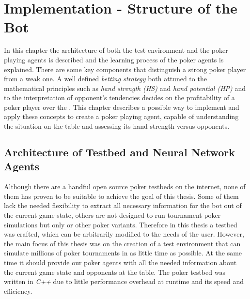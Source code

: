 
\chapter{Implementation - Structure of the Bot}
\label{cha:implementation}
In this chapter the architecture of both the test environment and the poker playing agents is described and the learning process of the poker agents is explained. There are some key components that distinguish a strong poker player from a weak one. A well defined \textit{betting strategy} both attuned to the mathematical principles such as \textit{hand strength (HS)} and \textit{hand potential (HP)} and to the interpretation of opponent's tendencies decides on the profitability of a poker player over the  \cite{opp_modeling}. This chapter describes a possible way to implement and apply these concepts to create a poker playing agent, capable of understanding the situation on the table and assessing its hand strength versus opponents. \pagebreak

\section{Architecture of Testbed and Neural Network Agents}
\label{sec:architecture}
Although there are a handful open source poker testbeds on the internet, none of them has proven to be suitable to achieve the goal of this thesis. Some of them lack the needed flexibility to extract all necessary information for the bot out of the current game state, others are not designed to run tournament poker simulations but only  or other poker variants. Therefore in this thesis a testbed was crafted, which can be arbitrarily modified to the needs of the user. However, the main focus of this thesis was on the creation of a test environment that can simulate millions of poker tournaments in as little time as possible. At the same time it should provide our poker agents with all the needed information about the current game state and opponents at the table. The poker testbed was written in \textit{C++} due to little performance overhead at runtime and its speed and efficiency.
